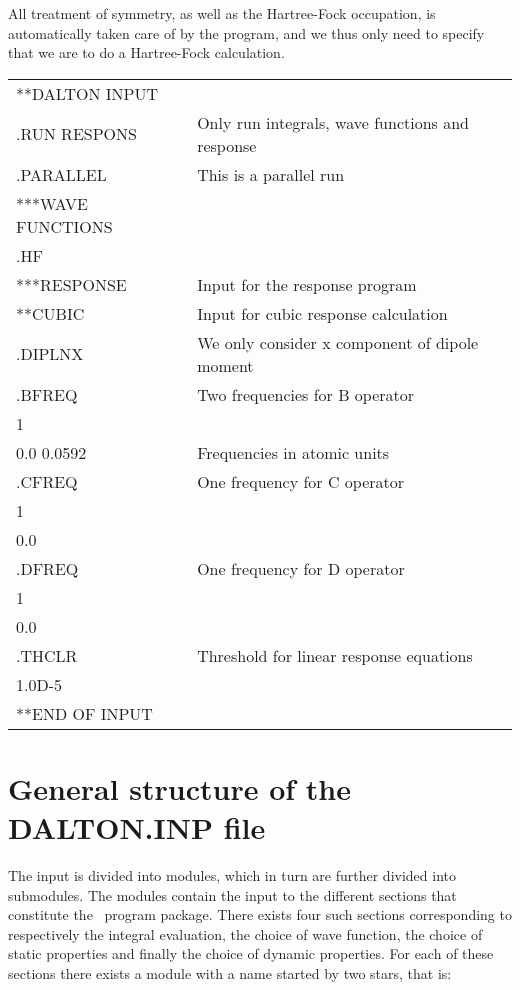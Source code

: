 All treatment  of symmetry, as well as the Hartree-Fock
occupation, is
automatically taken care of by the program, and we thus only need to
specify that we are to do a Hartree-Fock calculation.

{\ttfamily
\begin{tabular}{ll}
**DALTON INPUT\\
.RUN RESPONS\hspace{4cm} & Only run integrals, wave functions and
response\\
.PARALLEL & This is a parallel run\\
***WAVE FUNCTIONS\\
.HF\\
***RESPONSE & Input for the response program\\
**CUBIC & Input for cubic response calculation\\
.DIPLNX & We only consider x component of dipole moment\\
.BFREQ & Two frequencies for B operator\\
 1\\
 0.0 0.0592& Frequencies in atomic units\\
.CFREQ & One frequency for C operator\\
 1\\
 0.0\\
.DFREQ & One frequency for D operator\\
 1\\
 0.0\\
.THCLR & Threshold for linear response equations\\
 1.0D-5\\
**END OF INPUT\\
\end{tabular}}

\section{General structure of the DALTON.INP file}\label{sec:inputstructure}

The input is divided into modules, which in turn are
further divided into submodules. The modules contain
the input to the different
sections that constitute the \siraba\ program package. There exists
four such sections corresponding to respectively the integral
evaluation, the choice of wave function, the
choice of static properties and finally
the choice of dynamic properties. For each of
these sections there exists a module with a name started by two stars,
that is:

